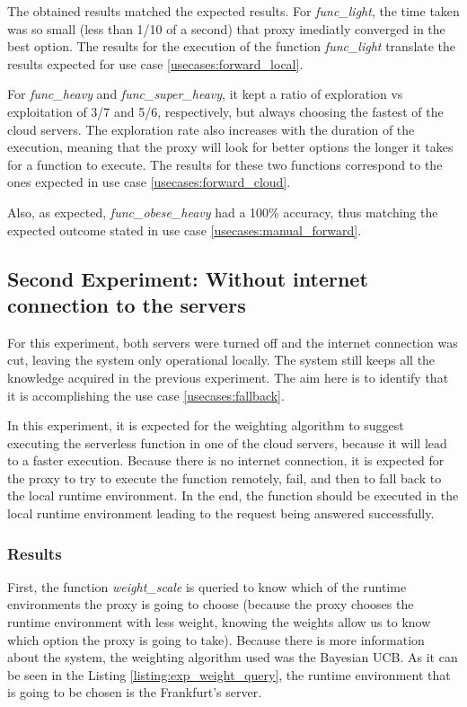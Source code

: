 The obtained results matched the expected results. For \textit{func\_light}, the
time taken was so small (less than 1/10 of a second) that proxy imediatly
converged in the best option. The results for the execution of the function
\textit{func\_light} translate the results expected for use case
\ref{usecases:forward_local}.

For \textit{func\_heavy} and \textit{func\_super\_heavy}, it kept a ratio of
exploration vs exploitation of 3/7 and 5/6, respectively, but always choosing the
fastest of the cloud servers. The exploration rate also increases with the
duration of the execution, meaning that the proxy will look for better options the
longer it takes for a function to execute. The results for these two functions
correspond to the ones expected in use case \ref{usecases:forward_cloud}.

Also, as expected, \textit{func\_obese\_heavy} had a 100\% accuracy, thus matching
the expected outcome stated in use case \ref{usecases:manual_forward}.

\subsection{Second Experiment: Without internet connection to the servers}
For this experiment, both servers were turned off and the internet connection was
cut, leaving the system only operational locally. The system still keeps all the
knowledge acquired in the previous experiment.
The aim here is to identify that it is accomplishing the use case
\ref{usecases:fallback}.

In this experiment, it is expected for the weighting algorithm to suggest
executing the serverless function in one of the cloud servers, because it will
lead to a faster execution. Because there is no internet connection, it is
expected for the proxy to try to execute the function remotely, fail, and then to
fall back to the local runtime environment. In the end, the function should be
executed in the local runtime environment leading to the request being answered
successfully.

\subsubsection{Results}
First, the function \textit{weight\_scale} is queried to know which of the runtime
environments the proxy is going to choose (because the proxy chooses the runtime environment with less weight, knowing the weights allow us to know which option
the proxy is going to take). Because there is more information about the system,
the weighting algorithm used was the Bayesian UCB. As it can be seen in the Listing
\ref{listing:exp_weight_query}, the runtime environment that is going to be
chosen is the Frankfurt's server.


